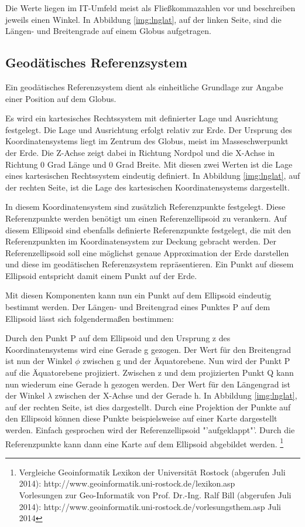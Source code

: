 			Die Werte liegen im IT-Umfeld meist als Fließkommazahlen vor und beschreiben jeweils einen Winkel.
			In Abbildung \ref{img:lnglat}, auf der linken Seite, sind die Längen- und Breitengrade auf einem Globus aufgetragen.

		\subsection{Geodätisches Referenzsystem} 
			
			Ein geodätisches Referenzsystem dient als einheitliche Grundlage zur Angabe einer Position auf dem Globus. 

			Es wird ein kartesisches Rechtssystem mit definierter Lage und Ausrichtung festgelegt.
			Die Lage und Ausrichtung erfolgt relativ zur Erde. 
			Der Ursprung des Koordinatensystems liegt im Zentrum des Globus, meist im Masseschwerpunkt der Erde.
			Die Z-Achse zeigt dabei in Richtung Nordpol und die X-Achse in Richtung 0 Grad Länge und 0 Grad Breite. 
			Mit diesen zwei Werten ist die Lage eines kartesischen Rechtssystem eindeutig definiert.
			In Abbildung \ref{img:lnglat}, auf der rechten Seite, ist die Lage des kartesischen Koordinatensystems dargestellt.

			In diesem Koordinatensystem sind zusätzlich Referenzpunkte festgelegt.
			Diese Referenzpunkte werden benötigt um einen Referenzellipsoid zu verankern. 
			Auf diesem Ellipsoid sind ebenfalls definierte Referenzpunkte festgelegt, die mit den Referenzpunkten im Koordinatensystem zur Deckung gebracht werden.
			Der Referenzellipsoid soll eine möglichst genaue Approximation der Erde darstellen und diese im geodätischen Referenzsystem repräsentieren. 
			Ein Punkt auf diesem Ellipsoid entspricht damit einem Punkt auf der Erde.

			Mit diesen Komponenten kann nun ein Punkt auf dem Ellipsoid eindeutig bestimmt werden.
			Der Längen- und Breitengrad eines Punktes P auf dem Ellipsoid lässt sich folgendermaßen bestimmen:

			Durch den Punkt P auf dem Ellipsoid und den Ursprung z des Koordinatensystems wird eine Gerade g gezogen. 
			Der Wert für den Breitengrad ist nun der Winkel $\phi$ zwischen g und der Äquatorebene.
			Nun wird der Punkt P auf die Äquatorebene projiziert.
			Zwischen z und dem projizierten Punkt Q kann nun wiederum eine Gerade h gezogen werden.
			Der Wert für den Längengrad ist der Winkel $\lambda$ zwischen der X-Achse und der Gerade h. 
			In Abbildung \ref{img:lnglat}, auf der rechten Seite, ist dies dargestellt.
			Durch eine Projektion der Punkte auf den Ellipsoid können diese Punkte beispielsweise auf einer Karte dargestellt werden.
			Einfach gesprochen wird der Referenzellipsoid "'aufgeklappt"'. 
			Durch die Referenzpunkte kann dann eine Karte auf dem Ellipsoid abgebildet werden.
			\footnote{Vergleiche Geoinformatik Lexikon der Universität Rostock (abgerufen Juli 2014): http://www.geoinformatik.uni-rostock.de/lexikon.asp \\ Vorlesungen zur Geo-Informatik von Prof. Dr.-Ing. Ralf Bill (abgerufen Juli 2014): http://www.geoinformatik.uni-rostock.de/vorlesungsthem.asp \label{ft:geoinfolex}  Juli 2014}

